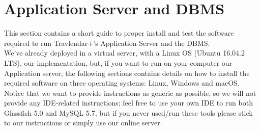 \section{Application Server and DBMS}
\label{sect:Application Server and DBMS}
This section contains a short guide to proper install and test the software required to run Travlendar+'s Application Server and the DBMS.\\
We've already deployed in a virtual server, with a Linux OS (Ubuntu 16.04.2 LTS), our implementation, but, if you want to run on your computer our Application server, the following sections contains details on how to install the required software on three operating systems: Linux, Windows and macOS.\\
Notice that we want to provide instructions as generic as possible, so we will not provide any IDE-related instructions; feel free to use your own IDE to run both Glassfish 5.0 and MySQL 5.7, but if you never used/run these tools please stick to our instructions or simply use our online server.
